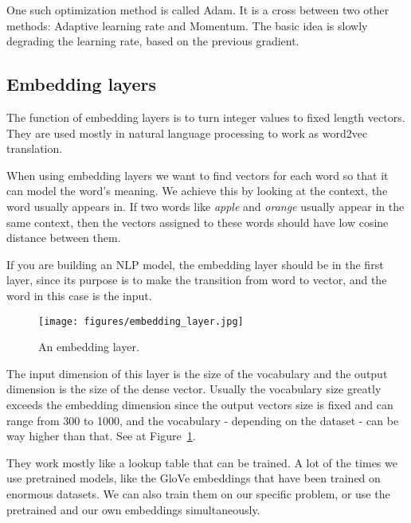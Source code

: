 One such optimization method is called Adam. It is a cross between two other methods: Adaptive learning rate and Momentum. The basic idea is slowly degrading the learning rate, based on the previous gradient.
\subsection{Embedding layers}

The function of embedding layers is to turn integer values to fixed length vectors. They are used mostly in natural language processing to work as word2vec translation.

When using embedding layers we want to find vectors for each word so that it
can model the word's meaning. We achieve this by looking at the context, the
word usually appears in. If two words like \textit{apple} and \textit{orange}
usually appear in the same context, then the vectors assigned to these words should have low cosine distance between them.

If you are building an NLP model, the embedding layer should be in the first layer, since its purpose is to make the transition from word to vector, and the word in this case is the input.

\begin{figure}[!ht]
	\centering
	\texttt{[image: figures/embedding\_layer.jpg]}
	\caption{An embedding layer.}
	\label{fig:embedding_layer}
\end{figure}

The input dimension of this layer is the size of the vocabulary and the output dimension is the size of the dense vector. Usually the vocabulary size greatly exceeds the embedding dimension since the output vectors size is fixed and can range from 300 to 1000, and the vocabulary - depending on the dataset - can be way higher than that. See at Figure~\ref{fig:embedding_layer}.

They work mostly like a lookup table that can be trained. A lot of the times we use pretrained models, like the GloVe embeddings that have been trained on enormous datasets. We can also train them on our specific problem, or use the pretrained and our own embeddings simultaneously.


